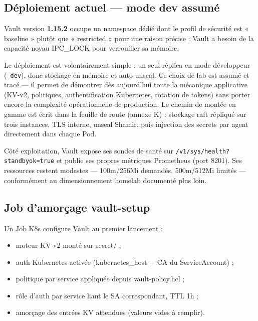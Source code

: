 \documentclass[12pt,a4paper]{article}
\begin{document}
\subsection{Déploiement actuel --- mode dev assumé}
Vault version \textbf{1.15.2} occupe un namespace dédié dont le profil de sécurité est « baseline » plutôt que « restricted » pour une raison précise : Vault a besoin de la capacité noyau IPC\_LOCK pour verrouiller sa mémoire.

Le déploiement est volontairement simple : un seul réplica en mode développeur (\texttt{-dev}), donc stockage en mémoire et auto-unseal. Ce choix de lab est assumé et tracé --- il permet de démontrer dès aujourd'hui toute la mécanique applicative (KV-v2, politiques, authentification Kubernetes, rotation de tokens) sans porter encore la complexité opérationnelle de production. Le chemin de montée en gamme est écrit dans la feuille de route (annexe K) : stockage raft répliqué sur trois instances, TLS interne, unseal Shamir, puis injection des secrets par agent directement dans chaque Pod.

Côté exploitation, Vault expose ses sondes de santé sur \texttt{/v1/sys/health?standbyok=true} et publie ses propres métriques Prometheus (port 8201). Ses ressources restent modestes --- 100m/256Mi demandés, 500m/512Mi limités --- conformément au dimensionnement homelab documenté plus loin.

\subsection{Job d'amorçage vault-setup}
Un Job K8s configure Vault au premier lancement :
\begin{itemize}[itemsep=1pt]
  \item moteur KV-v2 monté sur secret/ ;
  \item auth Kubernetes activée (kubernetes\_host + CA du ServiceAccount) ;
  \item politique par service appliquée depuis vault-policy.hcl ;
  \item rôle d'auth par service liant le SA correspondant, TTL 1h ;
  \item amorçage des entrées KV attendues (valeurs vides à remplir).
\end{itemize}
\end{document}
